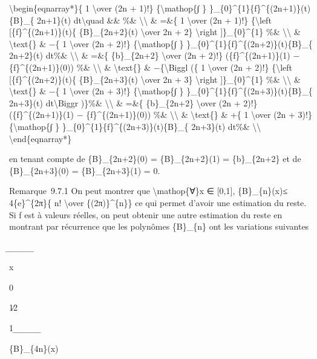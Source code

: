 \documentclass[]{article}
\begin{document}
\textbackslash{}begin\{eqnarray*\}\{ 1 \textbackslash{}over (2n + 1)!\}
\{\textbackslash{}mathop\{∫ \}
\}\_\{0\}\^{}\{1\}\{f\}\^{}\{(2n+1)\}(t)\{B\}\_\{ 2n+1\}(t)
dt\textbackslash{}quad \&\& \%\& \textbackslash{}\textbackslash{} \&
=\&\{ 1 \textbackslash{}over (2n + 1)!\} \{\textbackslash{}left
{[}\{f\}\^{}\{(2n+1)\}(t)\{ \{B\}\_\{2n+2\}(t) \textbackslash{}over 2n +
2\} \textbackslash{}right {]}\}\_\{0\}\^{}\{1\} \%\&
\textbackslash{}\textbackslash{} \& \textbackslash{}text\{\} \& −\{ 1
\textbackslash{}over (2n + 2)!\} \{\textbackslash{}mathop\{∫ \}
\}\_\{0\}\^{}\{1\}\{f\}\^{}\{(2n+2)\}(t)\{B\}\_\{ 2n+2\}(t) dt\%\&
\textbackslash{}\textbackslash{} \& =\&\{ \{b\}\_\{2n+2\}
\textbackslash{}over (2n + 2)!\} (\{f\}\^{}\{(2n+1)\}(1) −
\{f\}\^{}\{(2n+1)\}(0)) \%\& \textbackslash{}\textbackslash{} \&
\textbackslash{}text\{\} \& −\{\textbackslash{}Biggl (\{ 1
\textbackslash{}over (2n + 2)!\} \{\textbackslash{}left
{[}\{f\}\^{}\{(2n+2)\}(t)\{ \{B\}\_\{2n+3\}(t) \textbackslash{}over 2n +
3\} \textbackslash{}right {]}\}\_\{0\}\^{}\{1\} \%\&
\textbackslash{}\textbackslash{} \& \textbackslash{}text\{\} \& −\{ 1
\textbackslash{}over (2n + 3)!\} \{\textbackslash{}mathop\{∫ \}
\}\_\{0\}\^{}\{1\}\{f\}\^{}\{(2n+3)\}(t)\{B\}\_\{ 2n+3\}(t)
dt\textbackslash{}Biggr )\}\%\& \textbackslash{}\textbackslash{} \&
=\&\{ \{b\}\_\{2n+2\} \textbackslash{}over (2n + 2)!\}
(\{f\}\^{}\{(2n+1)\}(1) − \{f\}\^{}\{(2n+1)\}(0)) \%\&
\textbackslash{}\textbackslash{} \& \textbackslash{}text\{\} \& +\{ 1
\textbackslash{}over (2n + 3)!\} \{\textbackslash{}mathop\{∫ \}
\}\_\{0\}\^{}\{1\}\{f\}\^{}\{(2n+3)\}(t)\{B\}\_\{ 2n+3\}(t) dt\%\&
\textbackslash{}\textbackslash{} \textbackslash{}end\{eqnarray*\}

en tenant compte de \{B\}\_\{2n+2\}(0) = \{B\}\_\{2n+2\}(1) =
\{b\}\_\{2n+2\} et de \{B\}\_\{2n+3\}(0) = \{B\}\_\{2n+3\}(1) = 0.

Remarque~9.7.1 On peut montrer que \textbackslash{}mathop\{∀\}x ∈
{[}0,1{]}, \textbar{}\{B\}\_\{n\}(x)\textbar{}≤ 4\{e\}\^{}\{2π\}\{ n!
\textbackslash{}over \{(2π)\}\^{}\{n\}\} ce qui permet d'avoir une
estimation du reste. Si f est à valeurs réelles, on peut obtenir une
autre estimation du reste en montrant par récurrence que les polynômes
\{B\}\_\{n\} ont les variations suivantes

̲ ̲ ̲ ̲ ̲ ̲ ̲ ̲ ̲ ̲

x

0

1∕2

1 ̲ ̲ ̲ ̲ ̲ ̲ ̲ ̲ ̲ ̲

\{B\}\_\{4n\}(x)
\end{document}
